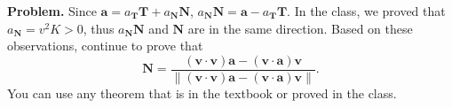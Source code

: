 \documentclass[12pt]{article}
\title{}
\date{}
\newcommand{\norm}[1]{\lVert #1 \rVert}
\begin{document}
\noindent
{\bf Problem.}
Since $\mathbf a = a_{\mathbf T}\mathbf T + a_{\mathbf N}\mathbf N$, $a_{\mathbf N}\mathbf N = \mathbf a - a_{\mathbf T}\mathbf T$. In the class, we proved that $a_{\mathbf N} = v^2K > 0$, thus $a_{\mathbf N}\mathbf N$ and $\mathbf N$ are in the same direction. Based on these observations, continue to prove that
\[
	\mathbf N = \frac{\left(\mathbf v\cdot\mathbf v\right)\mathbf a - \left(\mathbf v\cdot\mathbf a\right)\mathbf v}{\norm{\left(\mathbf v\cdot\mathbf v\right)\mathbf a - \left(\mathbf v\cdot\mathbf a\right)\mathbf v}}.
\]
You can use any theorem that is in the textbook or proved in the class.
\end{document}
